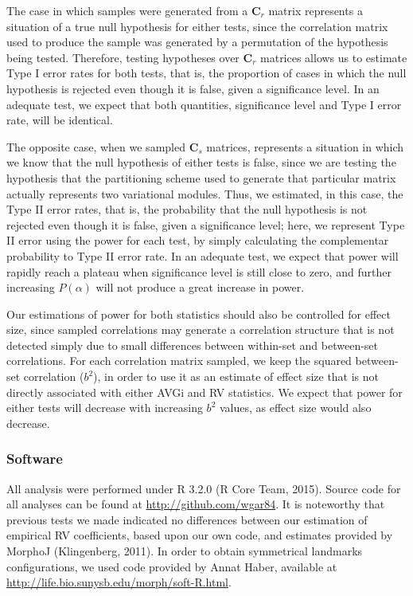 \documentclass[12pt,]{article}
\begin{document}
The case in which samples were generated from a $\mathbf{C}_r$ matrix
represents a situation of a true null hypothesis for either tests, since
the correlation matrix used to produce the sample was generated by a
permutation of the hypothesis being tested. Therefore, testing
hypotheses over $\mathbf{C}_r$ matrices allows us to estimate Type I
error rates for both tests, that is, the proportion of cases in which
the null hypothesis is rejected even though it is false, given a
significance level. In an adequate test, we expect that both quantities,
significance level and Type I error rate, will be identical.

The opposite case, when we sampled $\mathbf{C}_s$ matrices, represents a
situation in which we know that the null hypothesis of either tests is
false, since we are testing the hypothesis that the partitioning scheme
used to generate that particular matrix actually represents two
variational modules. Thus, we estimated, in this case, the Type II error
rates, that is, the probability that the null hypothesis is not rejected
even though it is false, given a significance level; here, we represent
Type II error using the power for each test, by simply calculating the
complementar probability to Type II error rate. In an adequate test, we
expect that power will rapidly reach a plateau when significance level
is still close to zero, and further increasing $P(\alpha)$ will not
produce a great increase in power.

Our estimations of power for both statistics should also be controlled
for effect size, since sampled correlations may generate a correlation
structure that is not detected simply due to small differences between
within-set and between-set correlations. For each correlation matrix
sampled, we keep the squared between-set correlation ($b^2$), in order
to use it as an estimate of effect size that is not directly associated
with either AVGi and RV statistics. We expect that power for either
tests will decrease with increasing $b^2$ values, as effect size would
also decrease.

\subsubsection{Software}\label{software}

All analysis were performed under R 3.2.0 (R Core Team, 2015). Source
code for all analyses can be found at \url{http://github.com/wgar84}. It
is noteworthy that previous tests we made indicated no differences
between our estimation of empirical RV coefficients, based upon our own
code, and estimates provided by MorphoJ (Klingenberg, 2011). In order to
obtain symmetrical landmarks configurations, we used code provided by
Annat Haber, available at
\url{http://life.bio.sunysb.edu/morph/soft-R.html}.
\end{document}
